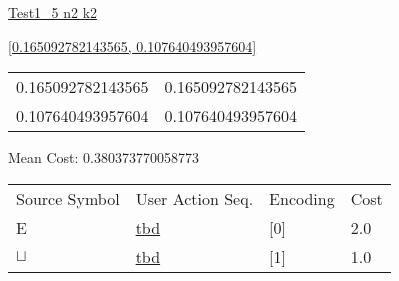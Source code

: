 \documentclass[12pt]{article}
\begin{document}
\noindent \url{Test1_5 n2 k2}

\noindent \url{[0.165092782143565, 0.107640493957604]}

\noindent\begin{tt}
\begin{small}
\begin{bundle}{}
\end{bundle}
\end{small}
\end{tt}
\newpage%
\begin{tabular}{l l}0.165092782143565	&	0.165092782143565\\
0.107640493957604	&	0.107640493957604\\
\end{tabular}\newpage
\noindent
\noindent Mean Cost: 0.380373770058773\\
\begin{tabular}{l l l l}
Source Symbol	&	User Action Seq.	&	Encoding	&	Cost\\
E	&	\url{tbd}	&	[0]	&	2.0\\
$\sqcup$	&	\url{tbd}	&	[1]	&	1.0\\
\end{tabular}
\end{document}
